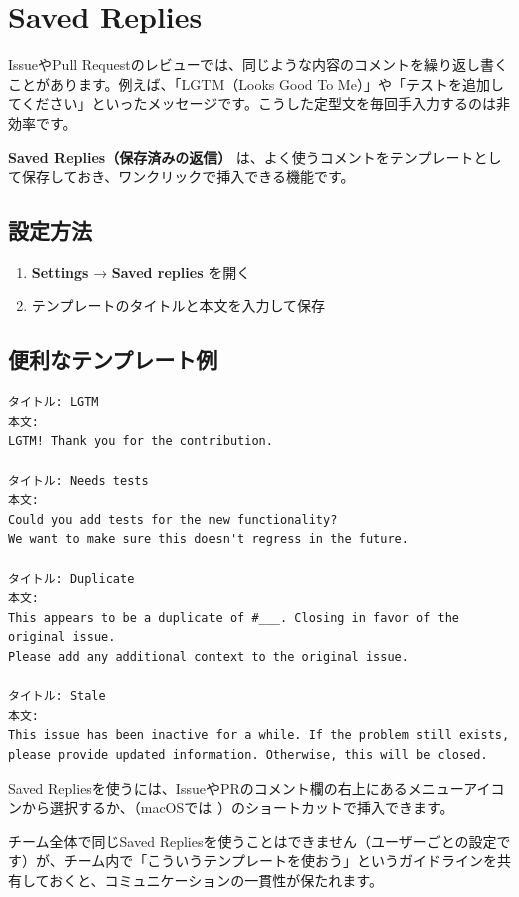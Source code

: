\section{Saved Replies}

IssueやPull Requestのレビューでは、同じような内容のコメントを繰り返し書くことがあります。例えば、「LGTM（Looks Good To Me）」や「テストを追加してください」といったメッセージです。こうした定型文を毎回手入力するのは非効率です。

\textbf{Saved Replies（保存済みの返信）} は、よく使うコメントをテンプレートとして保存しておき、ワンクリックで挿入できる機能です。

\subsection{設定方法}

\begin{enumerate}
  \item \textbf{Settings} → \textbf{Saved replies} を開く
  \item テンプレートのタイトルと本文を入力して保存
\end{enumerate}

\subsection{便利なテンプレート例}

\begin{lstlisting}[language={}]
タイトル: LGTM
本文:
LGTM! Thank you for the contribution.

タイトル: Needs tests
本文:
Could you add tests for the new functionality?
We want to make sure this doesn't regress in the future.

タイトル: Duplicate
本文:
This appears to be a duplicate of #___. Closing in favor of the original issue.
Please add any additional context to the original issue.

タイトル: Stale
本文:
This issue has been inactive for a while. If the problem still exists,
please provide updated information. Otherwise, this will be closed.
\end{lstlisting}

Saved Repliesを使うには、IssueやPRのコメント欄の右上にあるメニューアイコンから選択するか、（macOSでは ）のショートカットで挿入できます。

チーム全体で同じSaved Repliesを使うことはできません（ユーザーごとの設定です）が、チーム内で「こういうテンプレートを使おう」というガイドラインを共有しておくと、コミュニケーションの一貫性が保たれます。

